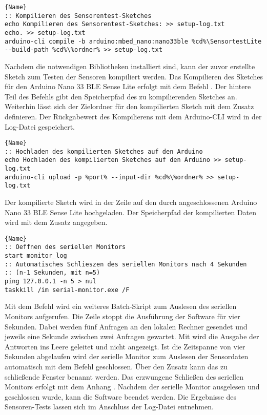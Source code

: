 \begin{lstlisting}{Name}
:: Kompilieren des Sensorentest-Sketches
echo Kompilieren des Sensorentest-Sketches: >> setup-log.txt
echo. >> setup-log.txt
arduino-cli compile -b arduino:mbed_nano:nano33ble %cd%\SensortestLite 
--build-path %cd%\%ordner% >> setup-log.txt
\end{lstlisting}

Nachdem die notwendigen Bibliotheken installiert sind, kann der zuvor erstellte Sketch zum Testen der Sensoren kompiliert werden. Das Kompilieren des Sketches für den Arduino Nano 33 BLE Sense Lite erfolgt mit dem Befehl . Der hintere Teil des Befehls gibt den Speicherpfad des zu kompilierenden Sketches an. Weiterhin lässt sich der Zielordner für den kompilierten Sketch mit dem Zusatz  definieren. Der Rückgabewert des Kompilierens mit dem Arduino-CLI wird in der Log-Datei gespeichert.

\begin{lstlisting}{Name}
:: Hochladen des kompilierten Sketches auf den Arduino
echo Hochladen des kompilierten Sketches auf den Arduino >> setup-log.txt
arduino-cli upload -p %port% --input-dir %cd%\%ordner% >> setup-log.txt
\end{lstlisting}

Der kompilierte Sketch wird in der Zeile    auf den durch  angeschlossenen Arduino Nano 33 BLE Sense Lite hochgeladen. Der Speicherpfad der kompilierten Daten wird mit dem Zusatz  angegeben.

\begin{lstlisting}{Name}
:: Oeffnen des seriellen Monitors
start monitor_log
:: Automatisches Schlieszen des seriellen Monitors nach 4 Sekunden 
:: (n-1 Sekunden, mit n=5)
ping 127.0.0.1 -n 5 > nul
taskkill /im serial-monitor.exe /F
\end{lstlisting}

Mit dem Befehl  wird ein weiteres Batch-Skript zum Auslesen des seriellen Monitors aufgerufen. Die Zeile  stoppt die Ausführung der Software für vier Sekunden. Dabei werden fünf Anfragen an den lokalen Rechner gesendet und jeweils eine Sekunde zwischen zwei Anfragen gewartet. Mit  wird die Ausgabe der Antworten ins Leere geleitet und nicht angezeigt. Ist die Zeitspanne von vier Sekunden abgelaufen wird der serielle Monitor zum Auslesen der Sensordaten automatisch mit dem Befehl  geschlossen. Über den Zusatz  kann das zu schließende Fenster  benannt werden. Das erzwungene Schließen des seriellen Monitors erfolgt mit dem Anhang . Nachdem der serielle Monitor ausgelesen und geschlossen wurde, kann die Software beendet werden. Die Ergebnisse des Sensoren-Tests lassen sich im Anschluss der Log-Datei entnehmen.

